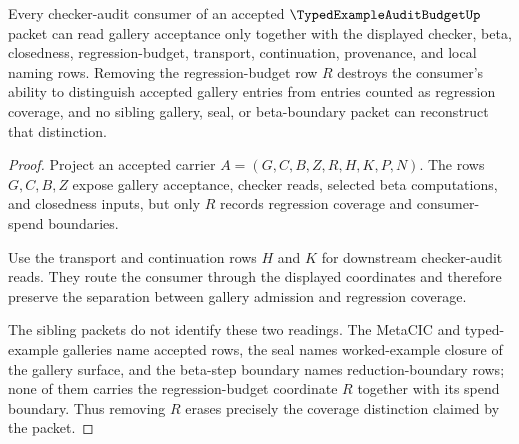 \begin{theorem}
\label{thm:typed-example-audit-budget-regression-nonescape}
Every checker-audit consumer of an accepted $\TypedExampleAuditBudgetUp$ packet can read gallery acceptance only together with the displayed checker, beta, closedness, regression-budget, transport, continuation, provenance, and local naming rows. Removing the regression-budget row $R$ destroys the consumer's ability to distinguish accepted gallery entries from entries counted as regression coverage, and no sibling gallery, seal, or beta-boundary packet can reconstruct that distinction.
\end{theorem}
\begin{proof}
Project an accepted carrier $A=(G,C,B,Z,R,H,K,P,N)$. The rows $G,C,B,Z$ expose gallery acceptance, checker reads, selected beta computations, and closedness inputs, but only $R$ records regression coverage and consumer-spend boundaries.

Use the transport and continuation rows $H$ and $K$ for downstream checker-audit reads. They route the consumer through the displayed coordinates and therefore preserve the separation between gallery admission and regression coverage.

The sibling packets do not identify these two readings. The MetaCIC and typed-example galleries name accepted rows, the seal names worked-example closure of the gallery surface, and the beta-step boundary names reduction-boundary rows; none of them carries the regression-budget coordinate $R$ together with its spend boundary. Thus removing $R$ erases precisely the coverage distinction claimed by the packet.
\end{proof}

